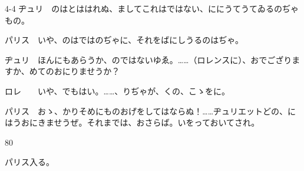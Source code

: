 \documentclass[tate,paper=b6j,jafontsize=9pt]{jlreq}
\begin{document}
\begin{azconvIndented}{4\zw}{-4\zw}
ヂュリ　のはとははれぬ、ましてこれはではない、ににうてうてゐるのぢゃもの。

パリス　いや、のはではのぢゃに、それをばにしうるのはぢゃ。

ヂュリ　ほんにもあらうか、のではないゆゑ。……（ロレンスに）、おでござりますか、めてのおにりませうか？

ロレ　　いや、でもはい。……、りぢゃが、くの、こゝをに。

パリス　おゝ、かりそめにものおげをしてはならぬ！……ヂュリエットどの、にはうおにきませうぜ。それまでは、おさらば。いをっておいてされ。

\end{azconvIndented}
\begin{azconvIndented}{8\zw}{0\zw}

パリス入る。

\end{azconvIndented}
\end{document}
